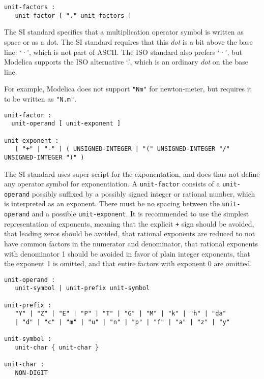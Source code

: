 \begin{lstlisting}[language=grammar]
unit-factors :
   unit-factor [ "." unit-factors ]
\end{lstlisting}

The SI standard specifies that a multiplication operator symbol is written as space or as a dot.
The SI standard requires that this \emph{dot} is a bit above the base line: `·', which is not part of ASCII.
The ISO standard also prefers `·', but Modelica supports the ISO alternative `.', which is an ordinary \emph{dot} on the base line.

For example, Modelica does not support \lstinline!"Nm"! for newton-meter, but requires it to be written as \lstinline!"N.m"!.

\begin{lstlisting}[language=grammar]
unit-factor :
  unit-operand [ unit-exponent ]

unit-exponent :
   [ "+" | "-" ] ( UNSIGNED-INTEGER | "(" UNSIGNED-INTEGER "/" UNSIGNED-INTEGER ")" )
\end{lstlisting}

The SI standard uses super-script for the exponentation, and does thus not define any operator symbol for exponentiation.
A \lstinline[language=grammar]!unit-factor! consists of a \lstinline[language=grammar]!unit-operand! possibly suffixed by a possibly signed integer or rational number, which is interpreted as an exponent.
There must be no spacing between the \lstinline[language=grammar]!unit-operand! and a possible \lstinline[language=grammar]!unit-exponent!.
It is recommended to use the simplest representation of exponents, meaning that the explicit \lstinline!+! sign should be avoided, that leading zeros should be avoided, that rational exponents are reduced to not have common factors in the numerator and denominator, that rational exponents with denominator 1 should be avoided in favor of plain integer exponents, that the exponent 1 is omitted, and that entire factors with exponent 0 are omitted.

\begin{lstlisting}[language=grammar]
unit-operand :
   unit-symbol | unit-prefix unit-symbol

unit-prefix :
   "Y" | "Z" | "E" | "P" | "T" | "G" | "M" | "k" | "h" | "da"
   | "d" | "c" | "m" | "u" | "n" | "p" | "f" | "a" | "z" | "y"

unit-symbol :
   unit-char { unit-char }

unit-char :
   NON-DIGIT
\end{lstlisting}

